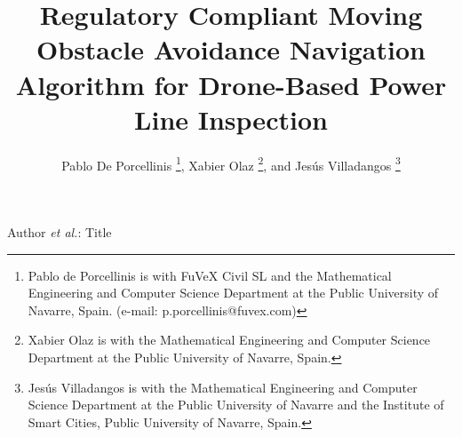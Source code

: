 \documentclass[journal,twoside,web]{ieeecolor}
\begin{document}
%

\title{Regulatory Compliant Moving Obstacle Avoidance Navigation Algorithm for Drone-Based Power Line Inspection}
\author{Pablo De Porcellinis \thanks{Pablo de Porcellinis is with FuVeX Civil SL and the Mathematical Engineering and Computer Science Department at the Public University of Navarre, Spain. (e-mail: p.porcellinis@fuvex.com)}, Xabier Olaz \thanks{Xabier Olaz is with the Mathematical Engineering and Computer Science Department at the Public University of Navarre, Spain.}, and Jes\'us Villadangos \thanks{Jes\'us Villadangos is with the Mathematical Engineering and Computer Science Department at the Public University of Navarre and the Institute of Smart Cities, Public University of Navarre, Spain.}}

{Author \MakeLowercase{\textit{et al.}}: Title}


\maketitle
\end{document}
